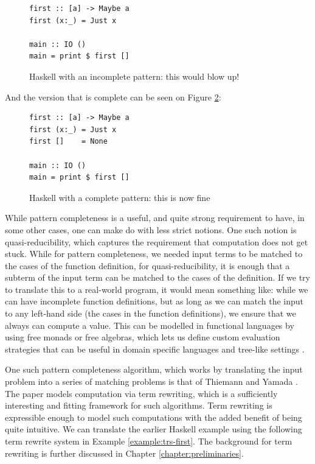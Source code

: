 \documentclass{report}
\theoremstyle{definition}
\begin{document}
\begin{figure}[!ht]
\centering
\begin{minipage}{0.5\linewidth}
\begin{verbatim}
first :: [a] -> Maybe a
first (x:_) = Just x

main :: IO ()
main = print $ first []
\end{verbatim}
\end{minipage}
    \caption{Haskell with an incomplete pattern: this would blow up!}
    \label{fig:haskell-incomplete}
\end{figure}

And the version that is complete can be seen on Figure \ref{fig:haskell-complete}:
\begin{figure}[!ht]
\centering
\begin{minipage}{0.5\linewidth}
\begin{verbatim}
first :: [a] -> Maybe a
first (x:_) = Just x
first []    = None
 
main :: IO ()
main = print $ first []
\end{verbatim}
\end{minipage}
    \caption{Haskell with a complete pattern: this is now fine}
    \label{fig:haskell-complete}
\end{figure}

\FloatBarrier

While pattern completeness is a useful, and quite strong requirement to have, in some other cases, one can make do with less strict notions. One such notion is quasi-reducibility, which captures the requirement that computation does not get stuck. While for pattern completeness, we needed input terms to be matched to the cases of the function definition, for quasi-reducibility, it is enough that a subterm of the input term can be matched to the cases of the definition. If we try to translate this to a real-world program, it would mean something like: while we can have incomplete function definitions, but as long as we can match the input to any left-hand side (the cases in the function definitions), we ensure that we always can compute a value. This can be modelled in functional languages by using free monads or free algebras, which lets us define custom evaluation strategies that can be useful in domain specific languages and tree-like settings \cite{free}.

One such pattern completeness algorithm, which works by translating the input problem into a series of matching problems is that of Thiemann and Yamada \cite{thiemann}. The paper models computation via term rewriting, which is a sufficiently interesting and fitting framework for such algorithms. Term rewriting is expressible enough to model such computations with the added benefit of being quite intuitive. We can translate the earlier Haskell example using the following term rewrite system in Example \ref{example:trs-first}. The background for term rewriting is further discussed in Chapter \ref{chapter:preliminaries}.
\end{document}
